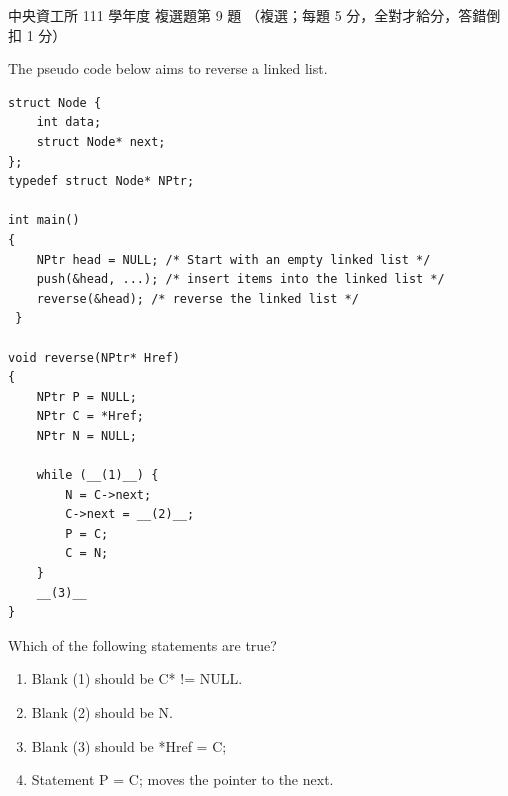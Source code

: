 \begin{pastexam}[label={px:ncu-111-dsa-09}]{中央資工所 111 學年度 複選題第 9 題}
（複選；每題 5 分，全對才給分，答錯倒扣 1 分）

The pseudo code below aims to reverse a linked list.
\begin{verbatim}
struct Node {
    int data;
    struct Node* next;
};
typedef struct Node* NPtr;

int main()
{
    NPtr head = NULL; /* Start with an empty linked list */
    push(&head, ...); /* insert items into the linked list */
    reverse(&head); /* reverse the linked list */
 }

void reverse(NPtr* Href)
{
    NPtr P = NULL;
    NPtr C = *Href;
    NPtr N = NULL;

    while (__(1)__) {
        N = C->next;
        C->next = __(2)__;
        P = C;
        C = N;
    }
    __(3)__
}
\end{verbatim}
Which of the following statements are true?
\begin{enumerate}[label=(\Alph*)]
\item Blank (1) should be C* != NULL.
\item Blank (2) should be N.
\item Blank (3) should be *Href = C;
\item Statement P = C; moves the pointer to the next.
\end{enumerate}
\end{pastexam}

